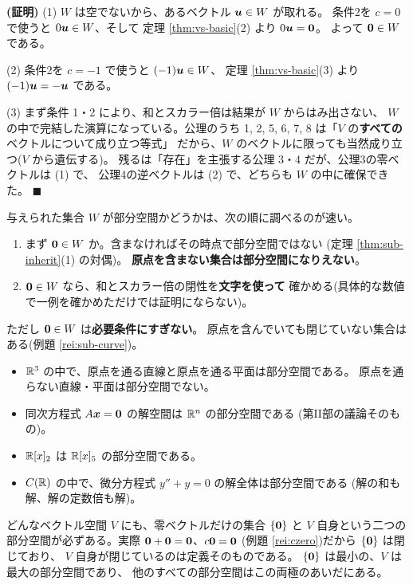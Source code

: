 \noindent\textbf{(証明)}\quad
(1) $W$ は空でないから、あるベクトル $\bm{u} \in W$ が取れる。
条件2を $c = 0$ で使うと $0\bm{u} \in W$、そして
定理 \ref{thm:vs-basic}(2) より $0\bm{u} = \bm{0}$。
よって $\bm{0} \in W$ である。

(2) 条件2を $c = -1$ で使うと $(-1)\bm{u} \in W$、
定理 \ref{thm:vs-basic}(3) より $(-1)\bm{u} = -\bm{u}$ である。

(3) まず条件 1・2 により、和とスカラー倍は結果が $W$ からはみ出さない、
$W$ の中で完結した演算になっている。公理のうち
1, 2, 5, 6, 7, 8 は「$V$ の\textbf{すべての}ベクトルについて成り立つ等式」
だから、$W$ のベクトルに限っても当然成り立つ($V$ から遺伝する)。
残るは「存在」を主張する公理 3・4 だが、公理3の零ベクトルは (1) で、
公理4の逆ベクトルは (2) で、どちらも $W$ の中に確保できた。 $\blacksquare$

\begin{chui}[判定の実際]\label{chui:sub-check}
与えられた集合 $W$ が部分空間かどうかは、次の順に調べるのが速い。
\begin{enumerate}
\item まず $\bm{0} \in W$ か。含まなければその時点で部分空間ではない
(定理 \ref{thm:sub-inherit}(1) の対偶)。
\textbf{原点を含まない集合は部分空間になりえない}。
\item $\bm{0} \in W$ なら、和とスカラー倍の閉性を\textbf{文字を使って}
確かめる(具体的な数値で一例を確かめただけでは証明にならない)。
\end{enumerate}
ただし $\bm{0} \in W$ は\textbf{必要条件にすぎない}。
原点を含んでいても閉じていない集合はある(例題 \ref{rei:sub-curve})。
\end{chui}

\begin{rei}
\begin{itemize}
\item $\mathbb{R}^3$ の中で、原点を通る直線と原点を通る平面は部分空間である。
原点を通らない直線・平面は部分空間でない。
\item 同次方程式 $A\bm{x} = \bm{0}$ の解空間は $\mathbb{R}^n$ の部分空間である
(第II部の議論そのもの)。
\item $\mathbb{R}[x]_2$ は $\mathbb{R}[x]_5$ の部分空間である。
\item $C(\mathbb{R})$ の中で、微分方程式 $y'' + y = 0$ の解全体は部分空間である
(解の和も解、解の定数倍も解)。
\end{itemize}
\end{rei}

\begin{rei}[自明な部分空間]
どんなベクトル空間 $V$ にも、零ベクトルだけの集合 $\{\bm{0}\}$ と
$V$ 自身という二つの部分空間が必ずある。実際
$\bm{0} + \bm{0} = \bm{0}$、$c\bm{0} = \bm{0}$
(例題 \ref{rei:czero})だから $\{\bm{0}\}$ は閉じており、
$V$ 自身が閉じているのは定義そのものである。
$\{\bm{0}\}$ は最小の、$V$ は最大の部分空間であり、
他のすべての部分空間はこの両極のあいだにある。
\end{rei}

